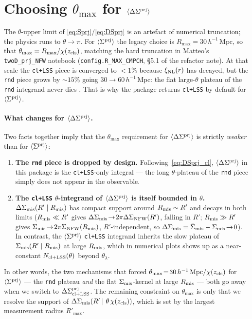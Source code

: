 \documentclass[a4paper, 11pt]{article}
\newcommand{\zcls}{z_{\rm cls}}
\newcommand{\xinl}{\xi_{\rm NL}}
\newcommand{\hMpc}{h^{-1}\,\mathrm{Mpc}}
\newcommand{\Sprj}{\Sigma^{\rm prj}}
\newcommand{\Smis}{\Sigma_{\rm mis}}
\newcommand{\DSmis}{\Delta\Sigma_{\rm mis}}
\newcommand{\DSprj}{\Delta\Sigma^{\rm prj}}
\newcommand{\avg}[1]{\langle #1 \rangle}
\newcommand{\Rmis}{R_{\rm mis}}
\begin{document}
\section{\texorpdfstring{Choosing \(\theta_{\max}\) for \(\avg{\DSprj}\)}{Choosing theta_max for DeltaSigma prj}}
\label{sec:theta_max}

The \(\theta\)-upper limit of \eqref{eq:Sprj}/\eqref{eq:DSprj} is
an artefact of numerical truncation; the physics runs to
\(\theta\!\to\!\pi\). For \(\avg{\Sprj}\) the legacy choice is
\(R_{\max}=30\,\hMpc\), so that
\(\theta_{\max}=R_{\max}/\chi(\zcls)\), matching the hard
truncation in Matteo's \texttt{twoD\_prj\_NFW} notebook
(\texttt{config.R\_MAX\_CMPCH}, \S5.1 of the refactor note). At
that scale the \texttt{cl+LSS} piece is converged to \(<\!1\%\)
because \(\xinl(r)\) has decayed, but the \texttt{rnd} piece
grows by \(\sim 15\%\) going \(30\!\to\!60\,\hMpc\): the flat
large-\(\theta\) plateau of the \texttt{rnd} integrand
never dies \citep[see][\S8]{SigmaPrjRefactor}. That is why the
package returns \texttt{cl+LSS} by default for \(\avg{\Sprj}\).

\paragraph{What changes for \(\avg{\DSprj}\).}
Two facts together imply that the \(\theta_{\max}\) requirement
for \(\avg{\DSprj}\) is strictly \emph{weaker} than for
\(\avg{\Sprj}\):
\begin{enumerate}\setlength\itemsep{2pt}
  \item \textbf{The \texttt{rnd} piece is dropped by design.}
        Following~\eqref{eq:DSprj_cl}, \(\avg{\DSprj}\) in this
        package is the \texttt{cl+LSS}-only integral --- the
        long \(\theta\)-plateau of the \texttt{rnd} piece simply
        does not appear in the observable.
  \item \textbf{The \texttt{cl+LSS} \(\theta\)-integrand of
        \(\avg{\DSprj}\) is itself bounded in \(\theta\).}
        \(\DSmis(R'\mid\Rmis)\) has compact support around
        \(\Rmis\sim R'\) and decays in both limits
        (\(\Rmis\ll R'\) gives
        \(\DSmis\!\to\!2\pi\Delta\Sigma_{\rm NFW}(R')\), falling
        in \(R'\); \(\Rmis\gg R'\) gives
        \(\Smis\!\to\!2\pi\Sigma_{\rm NFW}(\Rmis)\),
        \(R'\)-independent, so
        \(\DSmis=\bar\Sigma_{\rm mis}-\Smis\!\to\!0\)). In contrast, the
        \(\avg{\Sprj}\) \texttt{cl+LSS} integrand inherits the
        slow plateau of \(\Smis(R'\mid\Rmis)\) at large
        \(\Rmis\), which in numerical plots shows up as a near-constant
        \(N_{\rm cl+LSS}(\theta)\) beyond \(\theta_\lambda\).
\end{enumerate}
In other words, the two mechanisms that forced
\(\theta_{\max}\!=\!30\,\hMpc/\chi(\zcls)\) for \(\avg{\Sprj}\)
--- the \texttt{rnd} plateau \emph{and} the flat
\(\Smis\)-kernel at large \(\Rmis\) --- both go away when we
switch to \(\DSprj_{\rm cl+LSS}\). The remaining constraint on
\(\theta_{\max}\) is only that we resolve the support of
\(\DSmis(R'\mid\theta\,\chi(\zcls))\), which is set by the
largest measurement radius \(R'_{\max}\).
\end{document}
